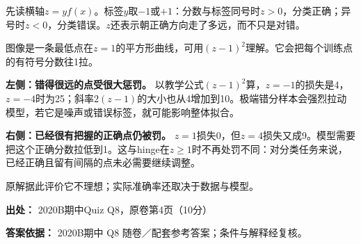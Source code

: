 先读横轴\(z=yf(x)\)。标签\(y\)取\(-1\)或\(+1\)：分数与标签同号时\(z>0\)，分类正确；异号时\(z<0\)，分类错误。\(z\)还表示朝正确方向走了多远，而不只是对错。


图像是一条最低点在\(z=1\)的平方形曲线，可用\((z-1)^2\)理解。它会把每个训练点的有符号分数往1拉。


\textbf{左侧：错得很远的点受很大惩罚。} 以教学公式\((z-1)^2\)算，\(z=-1\)的损失是4，\(z=-4\)时为25；斜率\(2(z-1)\)的大小也从4增加到10。极端错分样本会强烈拉动模型，若它是噪声或错误标签，就可能影响整体拟合。


\textbf{右侧：已经很有把握的正确点仍被罚。} \(z=1\)损失0，但\(z=4\)损失又成9。模型需要把这个正确分数拉低到1。这与hinge在\(z\ge1\)时不再处罚不同：对分类任务来说，已经正确且留有间隔的点未必需要继续调整。


原解据此评价它不理想；实际准确率还取决于数据与模型。


\textbf{出处：} 2020B期中Quiz Q8，原卷第4页（10分）


\textbf{答案依据：} 2020B期中 Q8 随卷／配套参考答案；条件与解释经复核。
